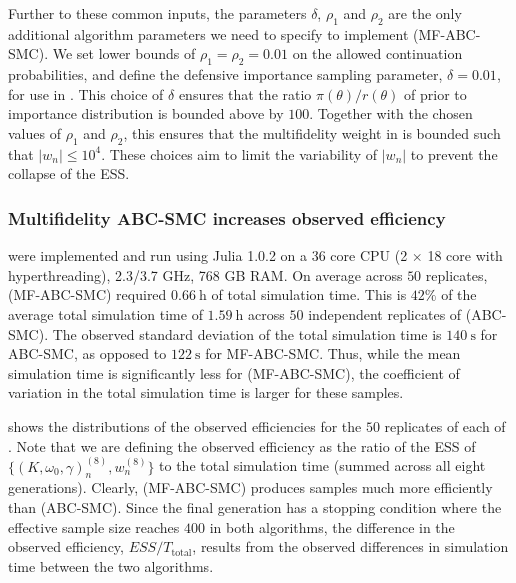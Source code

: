 \documentclass[12pt, onecolumn]{article}
\begin{document}
Further to these common inputs, the parameters $\delta$, $\rho_1$ and $\rho_2$ are the only additional algorithm parameters we need to specify to implement  (MF-ABC-SMC).
We set lower bounds of $\rho_1 = \rho_2 = 0.01$ on the allowed continuation probabilities, and define the defensive importance sampling parameter, $\delta = 0.01$, for use in .
This choice of $\delta$ ensures that the ratio $\pi(\theta)/r(\theta)$ of prior to importance distribution is bounded above by $100$.
Together with the chosen values of $\rho_1$ and $\rho_2$, this ensures that the multifidelity weight in  is bounded such that $|w_n| \leq 10^4$.
These choices aim to limit the variability of $|w_n|$ to prevent the collapse of the ESS.

\subsubsection{Multifidelity ABC-SMC increases observed efficiency}
\label{s:Results:Efficiency}

 were implemented and run using Julia 1.0.2 on a 36 core CPU (2 $\times$ 18 core with hyperthreading), 2.3/3.7 GHz, 768 GB RAM.
On average across $50$ replicates,  (MF-ABC-SMC) required $0.66~\mathrm{h}$ of total simulation time.
This is $42\%$ of the average total simulation time of $1.59~\mathrm{h}$ across $50$ independent replicates of  (ABC-SMC).
The observed standard deviation of the total simulation time is $140~\mathrm{s}$ for ABC-SMC, as opposed to $122~\mathrm{s}$ for MF-ABC-SMC.
Thus, while the mean simulation time is significantly less for   (MF-ABC-SMC), the coefficient of variation in the total simulation time is larger for these samples.

 shows the distributions of the observed efficiencies for the $50$ replicates of each of .
Note that we are defining the observed efficiency as the ratio of the ESS of $\{(K, \omega_0, \gamma)_n^{(8)},  w_n^{(8)} \}$ to the total simulation time (summed across all eight generations).
Clearly,  (MF-ABC-SMC) produces samples much more efficiently than  (ABC-SMC).
Since the final generation has a stopping condition where the effective sample size reaches $400$ in both algorithms, the difference in the observed efficiency, $ESS/T_{\mathrm{total}}$, results from the observed differences in simulation time between the two algorithms.
\end{document}
